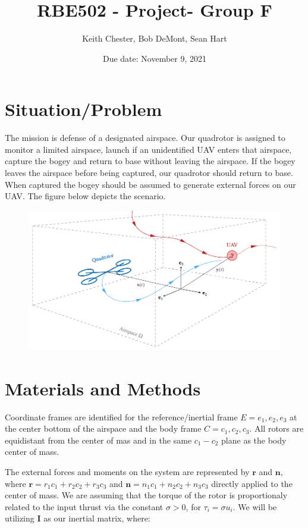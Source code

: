 \documentclass{article}
\title{RBE502 - Project- Group F}
\author{Keith Chester, Bob DeMont, Sean Hart}         %
\date{Due date: November  9, 2021}
\begin{document}
\maketitle
\section*{Situation/Problem}
The mission is defense of a designated airspace.  Our quadrotor is assigned to monitor a limited airspace, launch if an unidentified UAV enters that airspace, capture the bogey and return to base without leaving the airspace.  If the bogey leaves the airspace before being captured, our quadrotor should return to base.  When captured the bogey should be assumed to generate external forces on our UAV. The figure below depicts the scenario.
\begin{figure}[H]
    \centering
    \includegraphics[width = 1.0\textwidth]{figures/ProjProbStmt.png}
     \label{fig:prob}
\end{figure}

\section*{Materials and Methods}
Coordinate frames are identified for the reference/inertial frame $E={e_1, e_2, e_3}$ at the center bottom of the airspace and the body frame $C={c_1, c_2, c_3}$.  All rotors are equidistant from the center of mas and in the same $c_1-c_2 $ plane as the body center of mass.

The external forces and moments on the system are represented by $\boldsymbol{r}$ and $\boldsymbol{n}$, where $\boldsymbol{r} = r_1 c_1 + r_2 c_2 + r_3 c_3$ and $\boldsymbol{n} = n_1 c_1 + n_2 c_2 + n_3 c_3$ directly applied to the center of mass. We are assuming that the torque of the rotor is proportionaly related to the input thrust via the constant $\sigma>0$, for $\tau_i = \sigma u_i$. We will be utilizing $\boldsymbol{I}$ as our inertial matrix, where:
\end{document}
